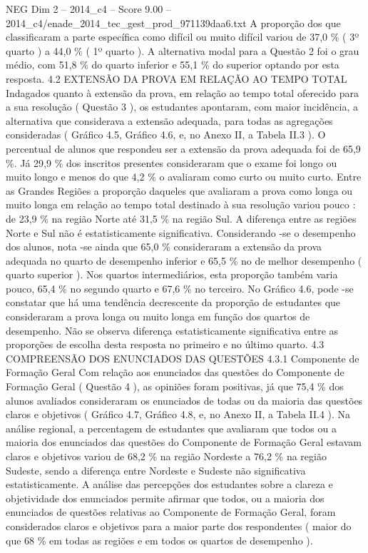 \begin{textsample}{NEG Dim 2 – 2014\_c4 – Score 9.00 – 2014\_c4/enade\_2014\_tec\_gest\_prod\_971139daa6.txt}
A proporção dos que classificaram a parte específica como difícil ou muito difícil variou de 37,0 \% ( 3º quarto ) a 44,0 \% ( 1º quarto ).
A alternativa modal para a Questão 2 foi o grau médio, com 51,8 \% do quarto inferior e 55,1 \% do superior optando por esta resposta. 4.2 EXTENSÃO DA PROVA EM RELAÇÃO AO TEMPO TOTAL Indagados quanto à extensão da prova, em relação ao tempo total oferecido para a sua resolução ( Questão 3 ), os estudantes apontaram, com maior incidência, a alternativa que considerava a extensão adequada, para todas as agregações consideradas ( Gráfico 4.5, Gráfico 4.6, e, no Anexo II, a Tabela II.3 ).
O percentual de alunos que respondeu ser a extensão da prova adequada foi de 65,9 \%.
Já 29,9 \% dos inscritos presentes consideraram que o exame foi longo ou muito longo e menos do que 4,2 \% o avaliaram como curto ou muito curto.
Entre as Grandes Regiões a proporção daqueles que avaliaram a prova como longa ou muito longa em relação ao tempo total destinado à sua resolução variou pouco : de 23,9 \% na região Norte até 31,5 \% na região Sul.
A diferença entre as regiões Norte e Sul não é estatisticamente significativa.
Considerando -se o desempenho dos alunos, nota -se ainda que 65,0 \% consideraram a extensão da prova adequada no quarto de desempenho inferior e 65,5 \% no de melhor desempenho ( quarto superior ).
Nos quartos intermediários, esta proporção também varia pouco, 65,4 \% no segundo quarto e 67,6 \% no terceiro.
No Gráfico 4.6, pode -se constatar que há uma tendência decrescente da proporção de estudantes que consideraram a prova longa ou muito longa em função dos quartos de desempenho.
Não se observa diferença estatisticamente significativa entre as proporções de escolha desta resposta no primeiro e no último quarto. 4.3 COMPREENSÃO DOS ENUNCIADOS DAS QUESTÕES 4.3.1 Componente de Formação Geral Com relação aos enunciados das questões do Componente de Formação Geral ( Questão 4 ), as opiniões foram positivas, já que 75,4 \% dos alunos avaliados consideraram os enunciados de todas ou da maioria das questões claros e objetivos ( Gráfico 4.7, Gráfico 4.8, e, no Anexo II, a Tabela II.4 ).
Na análise regional, a percentagem de estudantes que avaliaram que todos ou a maioria dos enunciados das questões do Componente de Formação Geral estavam claros e objetivos variou de 68,2 \% na região Nordeste a 76,2 \% na região Sudeste, sendo a diferença entre Nordeste e Sudeste não significativa estatisticamente.
A análise das percepções dos estudantes sobre a clareza e objetividade dos enunciados permite afirmar que todos, ou a maioria dos enunciados de questões relativas ao Componente de Formação Geral, foram considerados claros e objetivos para a maior parte dos respondentes ( maior do que 68 \% em todas as regiões e em todos os quartos de desempenho ).

\end{textsample}
